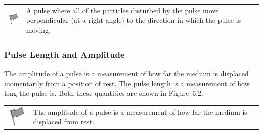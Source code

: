 \label{m38801*fhsst!!!underscore!!!id72}\begin{definition}
	  \begin{tabular*}{15 cm}{m{15 mm}m{}}
	\hspace*{-50pt}  \includegraphics[width=0.5in]{col11305.imgs/psflag2.png}   & \Definition{   \label{id2434870}\textbf{ Transverse Pulse }} { \label{m38801*meaningfhsst!!!underscore!!!id72}
      \label{m38801*id3129262}A pulse where all of the particles disturbed by the pulse move perpendicular (at a right angle) to the direction in which the pulse is moving. \par 
       } 
      \end{tabular*}
      \end{definition}


      \label{m38801*uid1}
            \subsubsection{ Pulse Length and Amplitude}
            \nopagebreak
            
        
        \label{m38801*id312946}The amplitude of a pulse is a measurement of how far the medium is displaced momentarily from a position of rest. The pulse length is a measurement of how long the pulse is. Both these quantities are shown in Figure~6.2.\par 
\label{m38801*fhsst!!!underscore!!!id77}\begin{definition}
	  \begin{tabular*}{15 cm}{m{15 mm}m{}}
	\hspace*{-50pt}  \includegraphics[width=0.5in]{col11305.imgs/psflag2.png}   & \Definition{   \label{id2434920}\textbf{ Amplitude }} { \label{m38801*meaningfhsst!!!underscore!!!id77}
        \label{m38801*id312963}The amplitude of a pulse is a measurement of how far the medium is displaced from rest. \par 
         } 
      \end{tabular*}
      \end{definition}

        
    \setcounter{subfigure}{0}


